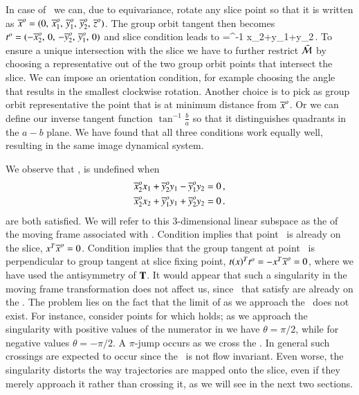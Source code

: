 In case of \cLe\ we can, due to equivariance, rotate any slice point so that it is written as
${\overline{x}^o}=(0,\,{\overline{x}^o_{1}},\,{\overline{y}^o_{1}},\,{\overline{y}^o_{2}},\,{\overline{z}^o_{}})$.
The group orbit tangent then becomes
$t^o_{}=(-{\overline{x}^o_{2}},\,0,\,-{\overline{y}^o_{2}},\,{\overline{y}^o_{1}},\,0)$
and slice condition  leads to
\beq
  \theta=\tan^{-1}
			  {x_2+y_1+y_2}\,.
To ensure a unique intersection with the slice we have to further restrict $\pSRed$
by choosing a representative out of the two group orbit points that intersect the slice.
We can impose an orientation condition, for example choosing the angle that 
results in the smallest clockwise rotation. Another choice is to pick as group
orbit representative the point that is at minimum distance from $\slicep$. Or we
can define our inverse tangent function $\tan^{-1}\frac{b}{a}$ so that it distinguishes quadrants
in the $a-b$ plane. 
We have found that all three conditions work equally well, resulting in the same image dynamical
system.

We observe that , is undefined when
\begin{subequations}\label{cLeMFsing}
  \begin{align}
    \slicepComp{x}{2}x_1+\slicepComp{y}{2}y_1-\slicepComp{y}{1}y_2 &=0 \label{cLeMFsingOnSlice}\cont
    \slicepComp{x}{2}x_2+\slicepComp{y}{1}y_1+\slicepComp{y}{2}y_2 &=0 \label{cLeMFsingPerpTan}\,.
  \end{align}
\end{subequations}
are both satisfied. We will refer to this $3$-dimensional linear subspace as the \emph{\sset} of the moving
frame associated with . Condition  implies that point \ssp\ is already
on the slice, $x^T{\overline{x}^o}=0$. Condition  implies that the group tangent
at point \ssp\ is perpendicular to group tangent at slice fixing point,
$t{}(x)^Tt^o_{}=-x^T{\overline{x}^o}=0$, where we have used the antisymmetry of $\mathbf{T}$.
It would appear that such a singularity in the moving frame transformation does not affect us,
since \ssp\ that satisfy  are already on the \slice. The problem lies on the fact
that the limit of  as we approach the \sset\ does not exist.
For instance, consider points for which 
holds; as we approach the singularity with positive values of the numerator in 
we have $\theta=\pi/2$, while for negative values $\theta=-\pi/2$. A $\pi$-jump occurs as
we cross the \sset. In general such crossings are expected to occur since the \sset\ is not
flow invariant. Even worse, the singularity distorts the way trajectories
are mapped onto the slice, even if they merely approach it rather than crossing it, as we
will see in the next two sections.

